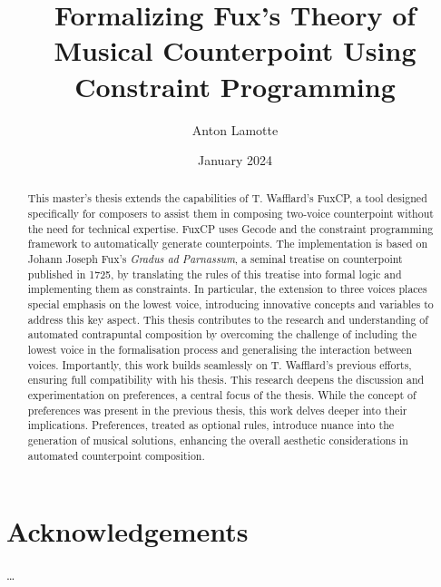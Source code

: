 \documentclass[11pt,table,xcdraw]{report}
\title{Formalizing Fux's Theory of Musical Counterpoint Using Constraint Programming}
\author{Anton Lamotte}
\date{January 2024}
\newcommand{\gap}{\textit{Gradus ad Parnassum}}
\begin{document}

\null
\thispagestyle{empty}
\addtocounter{page}{-1}
\newpage
{}
\begin{abstract}
    \large{
        This master's thesis extends the capabilities of T. Wafflard's FuxCP, a tool designed specifically for composers to assist them in composing two-voice counterpoint without the need for technical expertise. FuxCP uses Gecode and the constraint programming framework to automatically generate counterpoints. The implementation is based on Johann Joseph Fux's \gap, a seminal treatise on counterpoint published in 1725, by translating the rules of this treatise into formal logic and implementing them as constraints. In particular, the extension to three voices places special emphasis on the lowest voice, introducing innovative concepts and variables to address this key aspect.
        This thesis contributes to the research and understanding of automated contrapuntal composition by overcoming the challenge of including the lowest voice in the formalisation process and generalising the interaction between voices. Importantly, this work builds seamlessly on T. Wafflard's previous efforts, ensuring full compatibility with his thesis.
        This research deepens the discussion and experimentation on preferences, a central focus of the thesis. While the concept of preferences was present in the previous thesis, this work delves deeper into their implications. Preferences, treated as optional rules, introduce nuance into the generation of musical solutions, enhancing the overall aesthetic considerations in automated counterpoint composition.    }
\end{abstract}

\chapter*{Acknowledgements}
\dots
\restoregeometry 
\end{document}
